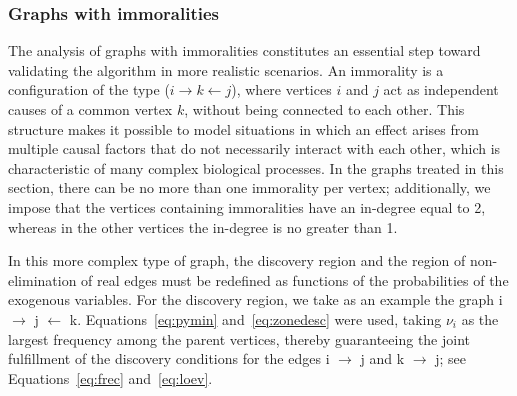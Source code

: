\documentclass[12pt,a4paper]{report}
\begin{document}
\subsubsection{Graphs with immoralities}
The analysis of graphs with immoralities constitutes an essential step toward validating the algorithm in more realistic scenarios. An immorality is a configuration of the type ($i \rightarrow k \leftarrow j$), where vertices $i$ and $j$ act as independent causes of a common vertex $k$, without being connected to each other. This structure makes it possible to model situations in which an effect arises from multiple causal factors that do not necessarily interact with each other, which is characteristic of many complex biological processes. In the graphs treated in this section, there can be no more than one immorality per vertex; additionally, we impose that the vertices containing immoralities have an in-degree equal to 2, whereas in the other vertices the in-degree is no greater than 1.


In this more complex type of graph, the discovery region and the region of non-elimination of real edges must be redefined as functions of the probabilities of the exogenous variables.
For the discovery region, we take as an example the graph i $\rightarrow$ j $\leftarrow$ k. Equations~\ref{eq:pymin} and~\ref{eq:zonedesc} were used, taking $\nu_i$ as the largest frequency among the parent vertices, thereby guaranteeing the joint fulfillment of the discovery conditions for the edges i $\rightarrow$ j and k $\rightarrow$ j; see Equations~\ref{eq:frec} and~\ref{eq:loev}.
\end{document}
